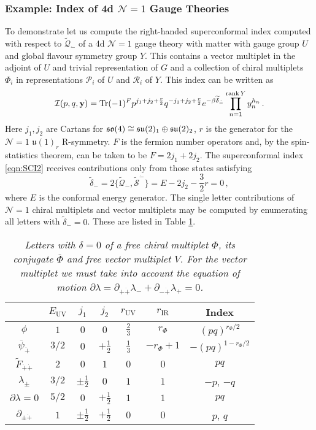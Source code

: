 \documentclass[main.tex]{subfiles}
\begin{document}
\subsubsection{Example: Index of 4d $\mathcal{N}=1$ Gauge Theories}
To demonstrate let us compute the right-handed superconformal index computed with respect to $\widetilde{\mathcal{Q}}_{\dot-}$ of a 4d $\mathcal{N}=1$ gauge theory with matter with gauge group $U$ and global flavour symmetry group $Y$.  This contains a vector multiplet in the adjoint of $U$ and trivial representation of $G$ and a collection of chiral multiplets $\Phi_i$ in representations $\mathcal{P}_i$ of $U$ and $\mathcal{R}_i$ of $Y$.  This index can be written as
\begin{equation}\label{eqn:SCI2}
\mathcal{I}(p,q,\mathbf{y})=\operatorname{Tr}(-1)^Fp^{j_1+j_2+\frac{r}{2}}q^{-j_1+j_2+\frac{r}{2}}e^{-\beta\widetilde{\delta}_{\dot-}}\prod_{n=1}^{\operatorname{rank} Y}y_n^{h_n}\,.
\end{equation}
Here $j_1,j_2$ are Cartans for $\mathfrak{so}(4)\cong\mathfrak{su}(2)_1\oplus\mathfrak{su}(2)_2$, $r$ is the generator for the $\mathcal{N}=1$ $\mathfrak{u}(1)_r$ R-symmetry. $F$ is the fermion number operators and, by the spin-statistics theorem, can be taken to be $F=2j_1+2j_2$.
The superconformal index \eqref{eqn:SCI2} receives contributions only from those states satisfying
\begin{equation}
\widetilde{\delta}_{\dot-}=2\{\widetilde{\mathcal{Q}}_{\dot-},\widetilde{\mathcal{S}}^{\dot-}\}=E-2j_2-\frac{3}{2}r=0\,,
\end{equation}
where $E$ is the conformal energy generator.
The single letter contributions of $\mathcal{N}=1$ chiral multiplets and vector multiplets may be computed by enumerating all letters with $\widetilde{\delta}_{\dot-}=0$.  These are listed in Table \ref{tab:letters}.  
\begin{table}
\centering
\begin{tabular}{|c||c|c|c|c|c|c|} 
\hline
 & $E_{\text{UV}}$ & $j_1$ & $j_2$ & $r_{\text{UV}}$ & $r_{\text{IR}}$& Index\\ 
 \hline\hline
  $\phi$ & $1$ & $0$ & $0$ & $\frac{2}{3}$ & $r_{\Phi}$ &$(pq)^{r_{\Phi}/2}$\\ \hline
 $\overline{\psi}_{\dot+}$ & $3/2$ & $0$ & $+\frac{1}{2}$ & $\frac{1}{3}$ & $-r_{\Phi}+1$ & $-(pq)^{1-r_{\Phi}/2}$\\ 
 \hline\hline
  $\widetilde{F}_{\dot+\dot+}$ & $2$ & $0$ & $1$ & $0$ & $0$ & $pq$\\ 
 \hline
   $\lambda_{\pm}$ & $3/2$ & $\pm\frac{1}{2}$ & $0$ & $1$ & $1$ & $-p$, $-q$\\ 
 \hline
    $\partial\lambda=0$ & $5/2$ & $0$ & $+\frac{1}{2}$ & $1$ & $1$ & $pq$\\ 
 \hline\hline
    $\partial_{\pm\dot+}$ & $1$ & $\pm\frac{1}{2}$ & $+\frac{1}{2}$ & $0$ & $0$ & $p$, $q$\\ 
 \hline
\end{tabular}
\caption{\textit{Letters with $\delta=0$ of a free chiral multiplet $\Phi$, its conjugate $\overline{\Phi}$ and free vector multiplet $V$.  For the vector multiplet we must take into account the equation of motion $\partial\lambda=\partial_{+\dot+}\lambda_{-}+\partial_{-\dot+}\lambda_{+}=0$.}\label{tab:letters}}
\end{table}
\end{document}
